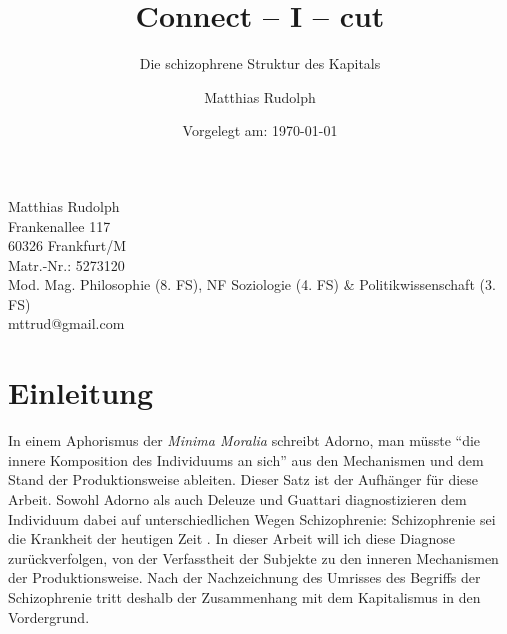 \documentclass[12pt,
               DIV13,
               paper=a4,
               twoside=false,
               onehalfspacing,
               bibliography=totoc,
               toc=graduated,
               draft,
               ]{scrartcl}
\newcommand{\pc}[2]{\parencite[#1]{#2}}
\newcommand{\dg}{Deleuze und Guattari\xspace}
\begin{document}
\setcounter{page}{0}

\titlehead{Goethe-Universität Frankfurt am Main\\
Fachbereich Philosophie und Geschichtswissenschaften\\
Institut für Philosophie\\
Prof. Dr. Christoph Menke\\
Seminar: Demokratie und Kapitalismus\\
SoSe 2013\\
Modul: Mod. Mag. VM 3b}
\title{Connect -- I -- cut}
\subtitle{Die schizophrene Struktur des Kapitals}
\author{Matthias Rudolph}
\date{Vorgelegt am: \today}

\maketitle
\vfill

\noindent Matthias Rudolph\\
Frankenallee 117\\
60326 Frankfurt/M\\
Matr.-Nr.: 5273120\\
Mod. Mag. Philosophie (8. FS), NF Soziologie (4. FS) \& Politikwissenschaft (3. FS)\\ %
mttrud@gmail.com
\newpage

\tableofcontents
\newpage


\section{Einleitung}

%
%

In einem Aphorismus der \emph{Minima Moralia} schreibt Adorno, man
müsste "`die innere Komposition des Individuums an sich"'
\pc{261}{min} aus den Mechanismen und dem Stand der Produktionsweise
ableiten. Dieser Satz ist der Aufhänger für diese Arbeit. Sowohl
Adorno als auch \dg diagnostizieren dem Individuum dabei auf
unterschiedlichen Wegen Schizophrenie: Schizophrenie sei die Krankheit
der heutigen Zeit \parencites[vgl.][263]{min}[28]{schizg}.
In dieser Arbeit will ich diese Diagnose zurückverfolgen, von der
Verfasstheit der Subjekte zu den inneren Mechanismen der
Produktionsweise. Nach der Nachzeichnung des Umrisses des Begriffs der
Schizophrenie tritt deshalb der Zusammenhang mit dem Kapitalismus in
den Vordergrund.
\end{document}
